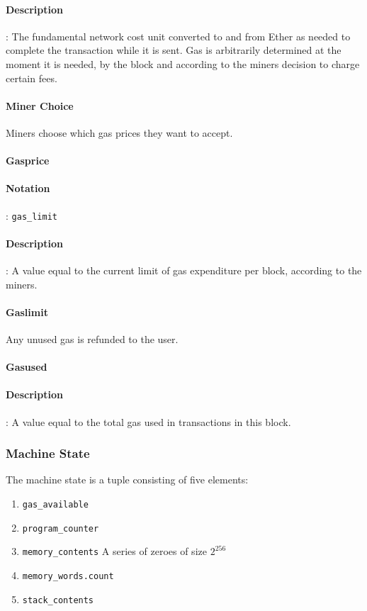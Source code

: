 \documentclass[10pt,a4paper,leqno,bibliography=totoc]{scrartcl}
\newenvironment{alphafootnotes}
{\par\edef\savedfootnotenumber{\number\value{footnote}}
\renewcommand{\thefootnote}{\alph{footnote}}
\setcounter{footnote}{0}}
{\par\setcounter{footnote}{\savedfootnotenumber}}
\begin{document}
\begin{alphafootnotes}
\begin{multicols*}{2}
				\paragraph{Description}: The fundamental network cost unit converted to and from Ether as needed to complete the transaction while it is sent. Gas is arbitrarily determined at the moment it is needed, by the block and according to the miners decision to charge certain fees. 
				\paragraph{Miner Choice}
					Miners choose which gas prices they want to accept.
	
				\paragraph{Gasprice}
					\paragraph{Notation}: \texttt{gas\_limit}
					\paragraph{Description}: A value equal to the current limit of gas expenditure per block, according to the miners. 
				\paragraph{Gaslimit}
					Any unused gas is refunded to the user.

				\paragraph{Gasused}
		\paragraph{Description}: A value equal to the total gas used in transactions in this block. 

			\subsubsection{Machine State}
			The machine state is a tuple consisting of five elements:
		
		\begin{enumerate}
			\item \texttt{gas\_available}
			\item \texttt{program\_counter}
			\item \texttt{memory\_contents} A series of zeroes of size $2^{256}$
			\item \texttt{memory\_words.count}
			\item \texttt{stack\_contents}
		\end{enumerate}
		

\end{multicols*}
\end{alphafootnotes}
\end{document}
